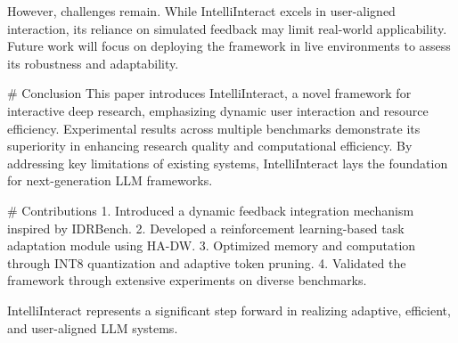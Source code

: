 However, challenges remain. While IntelliInteract excels in user-aligned interaction, its reliance on simulated feedback may limit real-world applicability. Future work will focus on deploying the framework in live environments to assess its robustness and adaptability.

# Conclusion  
This paper introduces IntelliInteract, a novel framework for interactive deep research, emphasizing dynamic user interaction and resource efficiency. Experimental results across multiple benchmarks demonstrate its superiority in enhancing research quality and computational efficiency. By addressing key limitations of existing systems, IntelliInteract lays the foundation for next-generation LLM frameworks.

# Contributions  
1. Introduced a dynamic feedback integration mechanism inspired by IDRBench.  
2. Developed a reinforcement learning-based task adaptation module using HA-DW.  
3. Optimized memory and computation through INT8 quantization and adaptive token pruning.  
4. Validated the framework through extensive experiments on diverse benchmarks.

IntelliInteract represents a significant step forward in realizing adaptive, efficient, and user-aligned LLM systems.